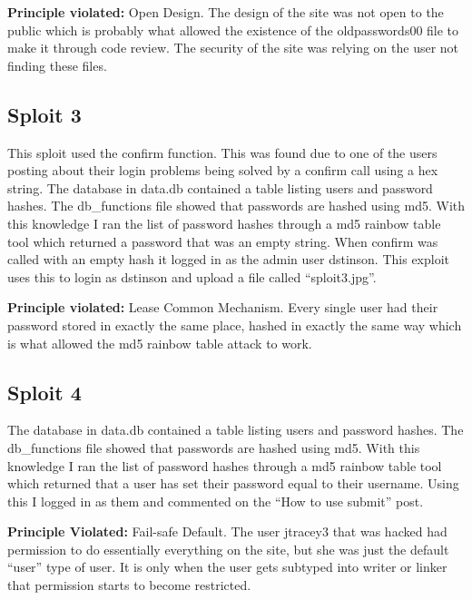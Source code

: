 \documentclass{article}
\begin{document}
	\textbf{Principle violated: } Open Design. The design of the site was not open to the public which is probably what allowed the existence of the oldpasswords00 file to make it through code review. The security of the site was relying on the user not finding these files.

	\subsection*{Sploit 3} %
	\label{sub:sploit_3}
	This sploit used the confirm function. This was found due to one of the users posting about their login problems being solved by a confirm call using a hex string. The database in data.db contained a table listing users and password hashes. The db\_functions file showed that passwords are hashed using md5. With this knowledge I ran the list of password hashes through a md5 rainbow table tool which returned a password that was an empty string. When confirm was called with an empty hash it logged in as the admin user dstinson. This exploit uses this to login as dstinson and upload a file called ``sploit3.jpg''.

	\textbf{Principle violated: }Lease Common Mechanism. Every single user had their password stored in exactly the same place, hashed in exactly the same way which is what allowed the md5 rainbow table attack to work.

	\subsection*{Sploit 4} %
	\label{sub:sploit_3}
	 The database in data.db contained a table listing users and password hashes. The db\_functions file showed that passwords are hashed using md5. With this knowledge I ran the list of password hashes through a md5 rainbow table tool which returned that a user has set their password equal to their username. Using this I logged in as them and commented on the ``How to use submit'' post.

	\textbf{Principle Violated: }Fail-safe Default. The user jtracey3 that was hacked had permission to do essentially everything on the site, but she was just the default ``user'' type of user. It is only when the user gets subtyped into writer or linker that permission starts to become restricted.   
\end{document}
